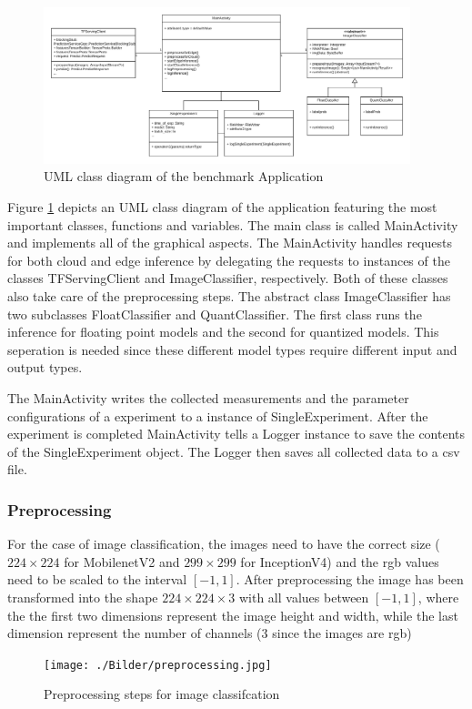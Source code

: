\begin{figure}[H]
\centering
\includegraphics[width=0.95\textwidth]{./Bilder/UML.png}
\caption{UML class diagram of the benchmark Application}
\label{fig:UML}
\end{figure}
Figure \ref{fig:UML} depicts an UML class diagram of the application featuring the most important classes, functions and variables. 
The main class is called MainActivity and implements all of the graphical aspects. 
The MainActivity handles requests for both cloud and edge inference by delegating the requests to instances of the classes TFServingClient and ImageClassifier, respectively. Both of these classes also take care of the preprocessing steps.
The abstract class ImageClassifier has two subclasses FloatClassifier and QuantClassifier. The first class runs the inference for floating point models and the second for quantized models.
This seperation is needed since these different model types require different input and output types.

The MainActivity writes the collected measurements and the parameter configurations of a experiment to a instance of SingleExperiment. After the experiment is completed MainActivity tells a Logger instance to save the contents of the SingleExperiment object. The Logger then saves all collected data to a csv file.

\subsubsection{Preprocessing}
For the case of image classification, the images need to have the correct size ($224\times224$ for MobilenetV2 and $299\times299$ for InceptionV4) and the rgb values need to be scaled to the interval $[-1,1]$. After preprocessing the image has been transformed into the shape $224\times224\times3$ with all values between $[-1,1]$, where the the first two dimensions represent the image height and width, while the last dimension represent the number of channels (3 since the images are rgb)
\begin{figure}[H]
\centering
\texttt{[image: ./Bilder/preprocessing.jpg]}
\caption{Preprocessing steps for image classifcation}
\label{fig:prepro}
\end{figure}
